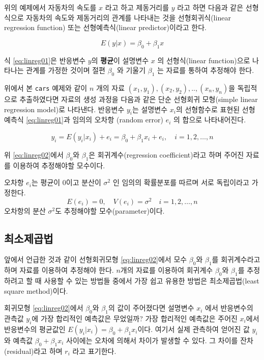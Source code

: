 \documentclass[
]{book}
\theoremstyle{definition}
\theoremstyle{definition}
\theoremstyle{definition}
\theoremstyle{remark}
\begin{document}
위의 예제에서 자동차의 속도를 \(x\) 라고 하고 제동거리를 \(y\) 라고 하면
다음과 같은 선형식으로 자동차의 속도와 제동거리의 관계를 나타내는 것을
선형회귀식(linear regression function) 또는 선형예측식(linear
predictor)이라고 한다.

\begin{equation} 
E(y|x) = \beta_0 + \beta_1 x
\label{eq:linreg01}
\end{equation}

식 \eqref{eq:linreg01}은 반응변수 \(y\)의 \textbf{평균}이 설명변수 \(x\) 의
선형식(linear function)으로 나타나는 관계를 가정한 것이며 절편 \(\beta_0\)
와 기울기 \(\beta_1\) 는 자료를 통하여 추정해야 한다.

위에서 본 \texttt{cars} 예제와 같이 \(n\) 개의 자료
\((x_1,y_1),(x_2,y_2),..,(x_n, y_n)\)을 독립적으로 추출하였다면 자료의
생성 과정을 다음과 같은 단순 선형회귀 모형(simple linear regression
model)로 나타낸다. 반응변수 \(y_i\)는 설명변수 \(x_i\)의 선형함수로 표현된
선형 예측식 \eqref{eq:linreg01}과 임의의 오차항 (random error) \(e_i\) 의
합으로 나타내어진다.

\begin{equation} 
y_i = E(y_i | x_i) + e_i = \beta_0 + \beta_1 x_i + e_i, \quad i=1,2,\dots,n
\label{eq:linreg02}
\end{equation}

위 \eqref{eq:linreg02}에서 \(\beta_0\)와 \(\beta_1\)은 회귀계수(regression
coefficient)라고 하며 주어진 자료를 이용하여 추정해야할 모수이다.

오차항 \(e_i\)는 평균이 \(0\)이고 분산이 \(\sigma^2\) 인 임의의 확률분포를
따르며 서로 독립이라고 가정한다.\\
\[ E(e_i)=0, \quad V(e_i) = \sigma^2 \quad i=1,2,\dots,n \] 오차항의
분산 \(\sigma^2\)도 추정해야할 모수(parameter)이다.

\hypertarget{lse}{%
\subsection{최소제곱법}\label{lse}}

앞에서 언급한 것과 같이 선형회귀모형 \eqref{eq:linreg02}에서 모수
\(\beta_0\)와 \(\beta_1\)를 회귀계수라고 하며 자료를 이용하여 추정해야 한다.
\(n\)개의 자료를 이용하여 회귀계수 \(\beta_0\)와 \(\beta_1\)를 추정하려고 할
때 사용할 수 있는 방법들 중에서 가장 쉽고 유용한 방법은 최소제곱법(least
square method)이다.

회귀모형 \eqref{eq:linreg02}에서 \(\beta_0\)와 \(\beta_1\)의 값이 주어졌다면
설명변수 \(x_i\) 에서 반응변수의 관측값 \(y_i\)에 가장 합리적인 예측값은
무었일까? 가장 합리적인 예측값은 주어진 \(x_i\)에서 반응변수의 평균값인
\(E(y_i | x_i)=\beta_0 + \beta_1 x_i\)이다. 여기서 실제 관측하여 얻어진 값
\(y_i\)와 예측값 \(\beta_0 + \beta_1 x_i\) 사이에는 오차에 의해서 차이가
발생할 수 있다. 그 차이를 잔차(residual)라고 하며 \(r_i\) 라고 표기한다.
\end{document}
